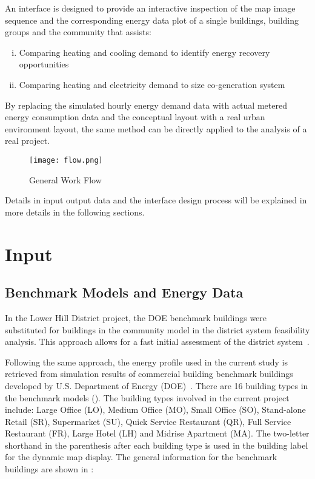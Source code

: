 An interface is designed to provide an interactive inspection of the
map image sequence and the corresponding energy data plot of a single
buildings, building groups and the community that assists:
\begin{enumerate}[i.]
\item Comparing heating and cooling demand to identify energy recovery
  opportunities
\item Comparing heating and electricity demand to size co-generation
  system
\end{enumerate}

By replacing the simulated hourly energy demand data with actual
metered energy consumption data and the conceptual layout with a real
urban environment layout, the same method can be directly applied to
the analysis of a real project.

\begin{figure}[h!]
  \centering
  \texttt{[image: flow.png]}
  \caption[General Work Flow]{General Work Flow}
  \label{fig:flow}
\end{figure}

Details in input output data and the interface design process will be
explained in more details in the following sections.
\newpage
\section{Input}
\subsection{Benchmark Models and Energy Data}
In the Lower Hill District project, the DOE benchmark buildings were
substituted for buildings in the community model in the district
system feasibility analysis. This approach allows for a fast initial
assessment of the district system~\cite{baird2014}.

Following the same approach, the energy profile used in the current
study is retrieved from simulation results of commercial building
benchmark buildings developed by U.S. Department of Energy
(DOE)~\cite{DOE2015}. There are 16 building types in the benchmark
models (). The building types involved in the
current project include: Large Office (LO), Medium Office (MO), Small
Office (SO), Stand-alone Retail (SR), Supermarket (SU), Quick Service
Restaurant (QR), Full Service Restaurant (FR), Large Hotel (LH) and
Midrise Apartment (MA). The two-letter shorthand in the parenthesis
after each building type is used in the building label for the dynamic
map display. The general information for the benchmark buildings are
shown in :

